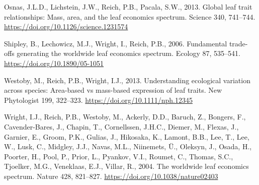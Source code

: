 \documentclass[
  12pt,
  letterpaper,
  DIV=11,
  numbers=noendperiod]{scrartcl}
\newlength{\cslhangindent}
\newenvironment{CSLReferences}[2] %
 {\begin{list}{}{%
  \setlength{\itemindent}{0pt}
  \setlength{\leftmargin}{0pt}
  \setlength{\parsep}{0pt}
  \ifodd #1
   \setlength{\leftmargin}{\cslhangindent}
   \setlength{\itemindent}{-1\cslhangindent}
  \fi
  \setlength{\itemsep}{#2\baselineskip}}}
 {\end{list}}
\numberwithin{equation}{section}
\begin{document}
\begin{CSLReferences}{1}{0}
Osnas, J.L.D., Lichstein, J.W., Reich, P.B., Pacala, S.W., 2013. Global
leaf trait relationships: {Mass}, area, and the leaf economics spectrum.
Science 340, 741--744. \url{https://doi.org/10.1126/science.1231574}

Shipley, B., Lechowicz, M.J., Wright, I., Reich, P.B., 2006. Fundamental
trade-offs generating the worldwide leaf economics spectrum. Ecology 87,
535--541. \url{https://doi.org/10.1890/05-1051}

Westoby, M., Reich, P.B., Wright, I.J., 2013. Understanding ecological
variation across species: {Area-based} vs mass-based expression of leaf
traits. New Phytologist 199, 322--323.
\url{https://doi.org/10.1111/nph.12345}

Wright, I.J., Reich, P.B., Westoby, M., Ackerly, D.D., Baruch, Z.,
Bongers, F., Cavender-Bares, J., Chapin, T., Cornellssen, J.H.C.,
Diemer, M., Flexas, J., Garnier, E., Groom, P.K., Gulias, J., Hikosaka,
K., Lamont, B.B., Lee, T., Lee, W., Lusk, C., Midgley, J.J., Navas,
M.L., Niinemets, Ü., Oleksyn, J., Osada, H., Poorter, H., Pool, P.,
Prior, L., Pyankov, V.I., Roumet, C., Thomas, S.C., Tjoelker, M.G.,
Veneklaas, E.J., Villar, R., 2004. The worldwide leaf economics
spectrum. Nature 428, 821--827.
\url{https://doi.org/10.1038/nature02403}

\end{CSLReferences}
\end{document}
